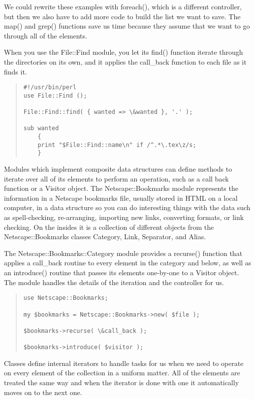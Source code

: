 We could rewrite these examples with foreach(), which is a different
controller, but then we also have to add more code to build the list
we want to save.  The map() and grep() functions save us time because
they assume that we want to go through all of the elements.

When you use the File::Find module, you let its find() function
iterate through the directories on its own, and it applies the
call_back function to each file as it finds it.

\begin{quote}
\begin{verbatim}
#!/usr/bin/perl
use File::Find ();

File::Find::find( { wanted => \&wanted }, '.' );

sub wanted 
	{
    print "$File::Find::name\n" if /^.*\.tex\z/s;
	}
\end{verbatim}
\end{quote}

Modules which implement composite data structures can define
methods to iterate over all of its elements to perform an
operation, such as a call back function or a Visitor object.
The Netscape::Bookmarks module represents the information in
a Netscape bookmarks file, usually stored in HTML on a local
computer, in a data structure so you can do interesting things 
with the data such as spell-checking, re-arranging, importing
new links, converting formats, or link checking.  On the insides
it is a collection of different objects from the Netscape::Bookmarks
classes Category, Link, Separator, and Alias.


The Netscape::Bookmarks::Category module provides a recurse() function
that applies a call\_back routine to every element in the category and
below, as well as an introduce() routine that passes its elements
one-by-one to a Visitor object.  The module handles the details of 
the iteration and the controller for us.

\begin{quote}
\begin{verbatim}
use Netscape::Bookmarks;

my $bookmarks = Netscape::Bookmarks->new( $file );

$bookmarks->recurse( \&call_back );

$bookmarks->introduce( $visitor );
\end{verbatim}
\end{quote}

Classes define internal iterators to handle tasks for us when we
need to operate on every element of the collection in a uniform
matter.  All of the elements are treated the same way and when
the iterator is done with one it automatically moves on to the
next one.

